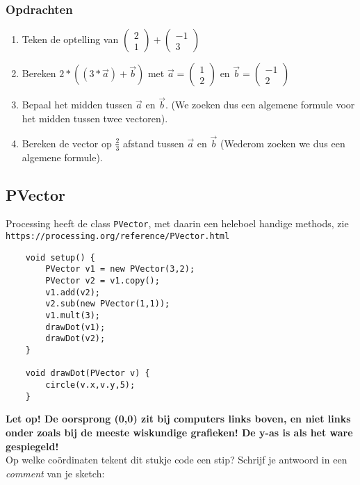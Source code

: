 \subsubsection{Opdrachten}
\begin{enumerate}
	\item Teken de optelling van $\begin{pmatrix}2\\1\end{pmatrix}+\begin{pmatrix}-1\\3\end{pmatrix}$
	\item Bereken $2*((3*\vec{a})+\vec{b})$ met $\vec{a}=\begin{pmatrix}1\\2\end{pmatrix}$ en $\vec{b} = \begin{pmatrix}-1\\2\end{pmatrix}$
	\item Bepaal het midden tussen $\vec{a}$ en $\vec{b}$. (We zoeken dus een algemene formule voor het midden tussen twee vectoren).
	\item Bereken de vector op $\frac{2}{3}$ afstand tussen $\vec{a}$ en $\vec{b}$ (Wederom zoeken we dus een algemene formule).
\end{enumerate}

\subsection{PVector}
Processing heeft de class \texttt{PVector}, met daarin een heleboel handige methods, zie \texttt{https://processing.org/reference/PVector.html}
\begin{lstlisting}
	void setup() {
		PVector v1 = new PVector(3,2);
		PVector v2 = v1.copy();
		v1.add(v2);
		v2.sub(new PVector(1,1));
		v1.mult(3);
		drawDot(v1);
		drawDot(v2);
	}
	
	void drawDot(PVector v) {
		circle(v.x,v.y,5);
	}
\end{lstlisting}
\textbf{Let op! De oorsprong (0,0) zit bij computers links boven, en niet links onder zoals bij de meeste wiskundige grafieken! De y-as is als het ware gespiegeld!}\\
Op welke co\"ordinaten tekent dit stukje code een stip?
Schrijf je antwoord in een \textit{comment} van je sketch:

